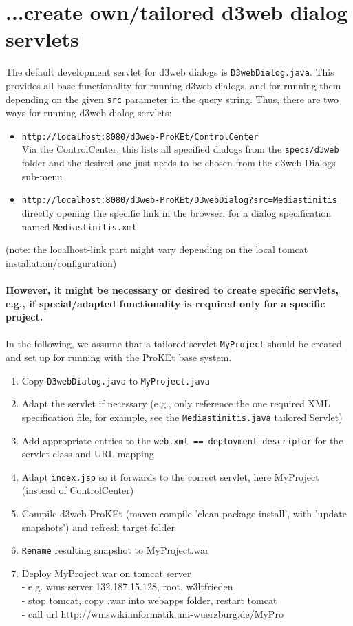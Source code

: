 \documentclass[a4paper,10pt]{scrreprt}
\begin{document}
\section{...create own/tailored d3web dialog servlets}\label{howtoservlets}
The default development servlet for d3web dialogs is \texttt{D3webDialog.java}. 
This provides all base functionality for running d3web dialogs, and for running them depending on the given
\texttt{src} parameter in the query string. 
Thus, there are two ways for running d3web dialog servlets:
\begin{itemize}
	\item \texttt{http://localhost:8080/d3web-ProKEt/ControlCenter}\\
	Via the ControlCenter, this lists all specified dialogs from the \texttt{specs/d3web} folder and the desired one just needs to be chosen from the d3web Dialogs sub-menu
	\item \texttt{http://localhost:8080/d3web-ProKEt/D3webDialog?src=Mediastinitis}\\
	directly opening the specific link in the browser, for a dialog specification named \texttt{Mediastinitis.xml}
\end{itemize}
(note: the localhost-link part might vary depending on the local tomcat installation/configuration)\\\\
%
\textbf{However, it might be necessary or desired to create specific servlets, e.g., if special/adapted functionality is required only for a specific project.} \\\\
In the following, we assume that a tailored servlet \texttt{MyProject} should be created and set up for running with the ProKEt base system.
\begin{enumerate}
	\item Copy \texttt{D3webDialog.java} to \texttt{MyProject.java}
	\item Adapt the servlet if necessary (e.g., only reference the one required XML specification file, for example, see the \texttt{Mediastinitis.java} tailored Servlet)
	\item Add appropriate entries to the \texttt{web.xml == deployment descriptor} for the servlet class and URL mapping
	\item Adapt \texttt{index.jsp} so it forwards to the correct servlet, here MyProject (instead of ControlCenter)
	\item Compile d3web-ProKEt (maven compile 'clean package install', with 'update snapshots') and refresh target folder
	\item \texttt{Rename} resulting snapshot to MyProject.war
	\item Deploy MyProject.war on tomcat server\\
	- e.g. wms server 132.187.15.128, root, w3ltfrieden\\
	- stop tomcat, copy .war into webapps folder, restart tomcat\\
	- call url http://wmswiki.informatik.uni-wuerzburg.de/MyPro\\
\end{enumerate}
\end{document}
